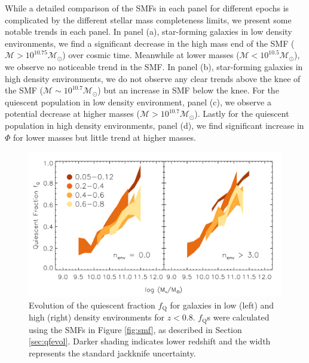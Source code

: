 While a detailed comparison of the SMFs in each panel for different
epochs is complicated by the different stellar mass completeness limits, we present some notable trends in each panel. In panel (a), star-forming galaxies in low density environments, we find a significant decrease in the high mass end of the SMF ($\mathcal{M} > 10^{10.75} \mathcal{M}_{\odot}$) over cosmic time. Meanwhile at lower masses ($\mathcal{M} < 10^{10.5} \mathcal{M}_{\odot}$), we observe no noticeable trend in the SMF. In panel (b), star-forming galaxies in high density environments, we do not observe any clear trends above the knee of the SMF ($\mathcal{M} \sim 10^{10.7} \mathcal{M}_{\odot}$) but an increase in SMF below the knee. For the quiescent population in low density environment, panel (c), we observe a potential decrease at higher masses ($\mathcal{M} > 10^{10.7} \mathcal{M}_{\odot}$). Lastly for the quiescent population in high density environments, panel (d), we find significant increase in $\Phi$ for lower masses but little trend at higher masses. 


\begin{figure}
\begin{center}
\includegraphics[width=\textwidth]{figs/qfenv/fig4.pdf}
\caption{Evolution of the quiescent fraction $f_{\mathrm{Q}}$ for
  galaxies in low (left) and high (right) density
  environments for $z < 0.8$. $f_{\mathrm{Q}}$s were calculated
  using the SMFs in Figure \ref{fig:smf}, as described in Section \ref{sec:qfevol}. Darker shading indicates lower redshift and the width represents the standard jackknife uncertainty.}         
\label{fig:qf}
\end{center}
\end{figure}

